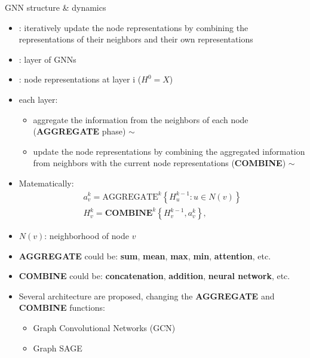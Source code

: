 \documentclass[presentation, 9pt]{beamer}\mode<presentation>{\usetheme{AMSBolognaFC}}
\begin{document}
\begin{frame}{GNN structure \& dynamics}
	\begin{itemize}
		\item {}: iteratively update the node representations 
		by combining the representations of their neighbors and their own representations
		\item {}: layer of GNNs
		\item {}: node representations at layer i ($H^0 = X$)
		\item each layer:
		\begin{itemize}
			\item aggregate the information from the neighbors of each node (\textbf{AGGREGATE} phase) $\sim$ 
			\item update the node representations by combining the aggregated information from neighbors with the current node representations (\textbf{COMBINE}) $\sim$ 
		\end{itemize}
		\item Matematically:
			$$
			\begin{array}{l}
			a_v^k=\text{AGGREGATE}^k\left\{H_u^{k-1}: u \in N(v)\right\} \\
			H_v^k=\mathbf{COMBINE}^k\left\{H_v^{k-1}, a_v^k\right\},
			\end{array}
			$$
		\item $N(v)$: neighborhood of node $v$
		\item \textbf{AGGREGATE} could be: \textbf{sum}, \textbf{mean}, \textbf{max}, \textbf{min}, \textbf{attention}, etc.
		\item \textbf{COMBINE} could be: \textbf{concatenation}, \textbf{addition}, \textbf{neural network}, etc.
		\item Several architecture are proposed, changing the \textbf{AGGREGATE} and \textbf{COMBINE} functions:
		\begin{itemize}
			\item Graph Convolutional Networks (GCN)~\cite{kipf2016semi}
			\item Graph SAGE~\cite{hamilton2017inductive}
		\end{itemize}
	\end{itemize}
\end{frame}
\end{document}

